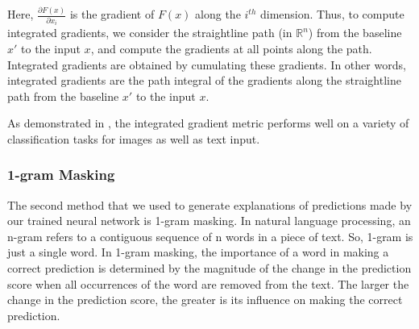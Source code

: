 Here, $\frac{\partial F(x)}{\partial x_i}$ is the gradient of $F(x)$ along the $i^{th}$ dimension. Thus, to compute integrated gradients, we consider the straightline path (in $\mathbb{R}^n$) from the baseline $x'$ to the input $x$, and compute the gradients at all points along the path. Integrated gradients are obtained by cumulating these gradients. In other words, integrated gradients are the path integral of the gradients along the straightline path from the baseline $x'$ to the input $x$.

As demonstrated in \cite{Sundararajan2017}, the integrated gradient metric performs well on a variety of classification tasks for images as well as text input.

\subsubsection{1-gram Masking}

The second method that we used to generate explanations of predictions made by our trained neural network is 1-gram masking. In natural language processing, an n-gram refers to a contiguous sequence of n words in a piece of text. So, 1-gram is just a single word. In 1-gram masking, the importance of a word in making a correct prediction is determined by the magnitude of the change in the prediction score when all occurrences of the word are removed from the text. The larger the change in the prediction score, the greater is its influence on making the correct prediction.
